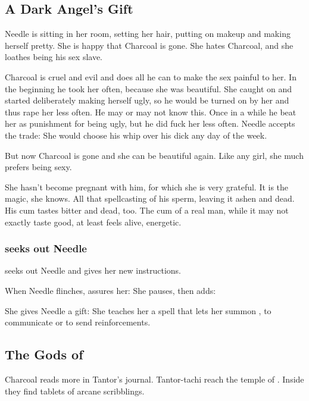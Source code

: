 \subsection{A Dark Angel's Gift}
Needle is sitting in her room, setting her hair, putting on makeup and making herself pretty. She is happy that Charcoal is gone. She hates Charcoal, and she loathes being his sex slave. 

Charcoal is cruel and evil and does all he can to make the sex painful to her. In the beginning he took her often, because she was beautiful. She caught on and started deliberately making herself ugly, so he would be turned on by her and thus rape her less often. He may or may not know this. Once in a while he beat her as punishment for being ugly, but he did fuck her less often. Needle accepts the trade: She would choose his whip over his dick any day of the week. 

But now Charcoal is gone and she can be beautiful again. Like any girl, she much prefers being sexy. 

She hasn't become pregnant with him, for which she is very grateful. It is the magic, she knows. All that spellcasting  of his sperm, leaving it ashen and dead. His cum tastes bitter and dead, too. The cum of a real man, while it may not exactly taste good, at least feels alive, energetic. 





\subsubsection{\Achsah{} seeks out Needle}
 seeks out Needle and gives her new instructions. 

When Needle flinches, \Achsah{} assures her: 
She pauses, then adds: 

She gives Needle a gift: She teaches her a spell that lets her summon \Achsah{}, to communicate or to send reinforcements. 







\subsection{The Gods of \EreshKal}
Charcoal reads more in Tantor's journal. Tantor-tachi reach the temple of \Rungertemple. Inside they find tablets of arcane scribblings. 


